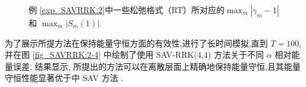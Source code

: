 \begin{figure}[H]
\begin{center}
\caption{例 \ref{exp_SAVRRK:2}中一些松弛格式（RT）所对应的$\max_m\left|\gamma_m-1\right|$ 和 $\max_m\left|S_m(1)\right|$.}
\label{fig_SAVRRK:2-1}
\end{center}
\end{figure}
为了展示所提方法在保持能量守恒方面的有效性,进行了长时间模拟,直到 $T=100$,
并在图 \ref{fig_SAVRRK:2-4} 中绘制了使用 SAV-RRK(4,4) 方法关于不同 $\alpha$ 相对能量误差.
结果显示, 所提出的方法可以在离散层面上精确地保持能量守恒,且其能量守恒性能显著优于中 SAV 方法 \cite{chengConvergenceEnergyconservingScheme2022}.
